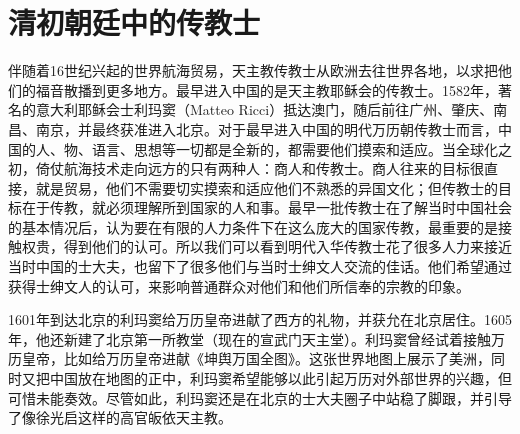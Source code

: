 \begin{sectionnotes}






\end{sectionnotes}
\section{清初朝廷中的传教士}


伴随着16世纪兴起的世界航海贸易，天主教传教士从欧洲去往世界各地，以求把他们的福音散播到更多地方。最早进入中国的是天主教耶稣会的传教士。1582年，著名的意大利耶稣会士利玛窦（Matteo Ricci）抵达澳门，随后前往广州、肇庆、南昌、南京，并最终获准进入北京。对于最早进入中国的明代万历朝传教士而言，中国的人、物、语言、思想等一切都是全新的，都需要他们摸索和适应。当全球化之初，倚仗航海技术走向远方的只有两种人：商人和传教士。商人往来的目标很直接，就是贸易，他们不需要切实摸索和适应他们不熟悉的异国文化；但传教士的目标在于传教，就必须理解所到国家的人和事。最早一批传教士在了解当时中国社会的基本情况后，认为要在有限的人力条件下在这么庞大的国家传教，最重要的是接触权贵，得到他们的认可。所以我们可以看到明代入华传教士花了很多人力来接近当时中国的士大夫，也留下了很多他们与当时士绅文人交流的佳话。他们希望通过获得士绅文人的认可，来影响普通群众对他们和他们所信奉的宗教的印象。



1601年到达北京的利玛窦给万历皇帝进献了西方的礼物，并获允在北京居住。1605年，他还新建了北京第一所教堂（现在的宣武门天主堂）。利玛窦曾经试着接触万历皇帝，比如给万历皇帝进献《坤舆万国全图》。这张世界地图上展示了美洲，同时又把中国放在地图的正中，利玛窦希望能够以此引起万历对外部世界的兴趣，但可惜未能奏效。尽管如此，利玛窦还是在北京的士大夫圈子中站稳了脚跟，并引导了像徐光启这样的高官皈依天主教。


